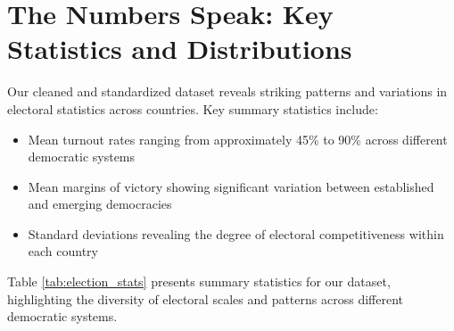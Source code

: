 \section{The Numbers Speak: Key Statistics and Distributions}

Our cleaned and standardized dataset reveals striking patterns and variations in electoral statistics across countries. Key summary statistics include:
\begin{itemize}
    \item Mean turnout rates ranging from approximately 45\% to 90\% across different democratic systems \cite{BorRayBou2012}
    \item Mean margins of victory showing significant variation between established and emerging democracies
    \item Standard deviations revealing the degree of electoral competitiveness within each country
\end{itemize}

Table \ref{tab:election_stats} presents summary statistics for our dataset, highlighting the diversity of electoral scales and patterns across different democratic systems.

